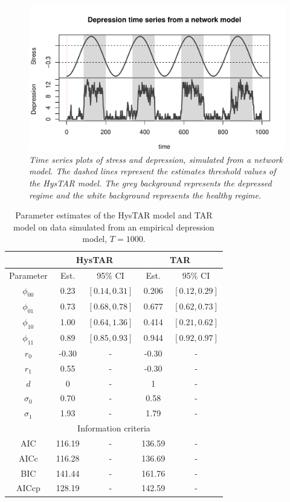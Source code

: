 \documentclass{article}
\begin{document}
\begin{figure} 
\begin{center}
\includegraphics[scale=.6]{ts_plot_MD}
\caption{\textit{Time series plots of stress and depression, simulated from a network model. The dashed lines represent the estimates threshold values of the HysTAR model. The grey background represents the depressed regime and the white background represents the healthy regime.}}
\label{fig:ts_plot_MD}
\end{center}
\end{figure}

\begin{table}[h!]
\begin{center}
\begin{tabular}{ c c c c c }
\hline
 & \multicolumn{2}{c}{HysTAR} & \multicolumn{2}{c}{TAR} \\
 \hline
Parameter & Est. & 95\% CI & Est. & 95\% CI \\
\hline
$\phi_{00}$ & 0.23 & $[0.14, 0.31]$ & 0.206 & $[0.12, 0.29]$ \\
$\phi_{01}$ & 0.73 & $[0.68, 0.78]$ & 0.677 & $[0.62, 0.73]$ \\
$\phi_{10}$ & 1.00 & $[0.64, 1.36]$ & 0.414 & $[0.21, 0.62]$ \\
$\phi_{11}$ & 0.89 & $[0.85, 0.93]$ & 0.944 & $[0.92, 0.97]$ \\
$r_0$ & -0.30 & - & -0.30 & - \\
$r_1$ & 0.55 & - & -0.30 & - \\
$d$ & 0 & - & 1 & - \\
$\sigma_0$ & 0.70 & - & 0.58 & - \\
$\sigma_1$ & 1.93 & - & 1.79 & - \\
\multicolumn{5}{c}{Information criteria} \\
\hline
AIC  & 116.19 & - & 136.59 & - \\
AICc & 116.28 & - & 136.69 & - \\
BIC  & 141.44 & - & 161.76 & - \\
AICcp & 128.19 & - & 142.59 & - \\
\hline
\end{tabular}
\caption{Parameter estimates of the HysTAR model and TAR model on data simulated from an empirical depression model, $T = 1000$.}
\label{tab:results_MD}
\end{center}
\end{table}
\end{document}
